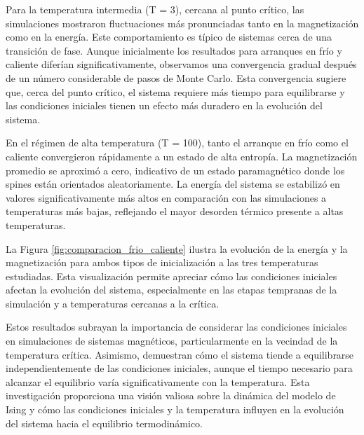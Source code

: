 \documentclass[twocolumn]{article}
\begin{document}
Para la temperatura intermedia (T = 3), cercana al punto crítico, las simulaciones mostraron fluctuaciones más pronunciadas tanto en la magnetización como en la energía. Este comportamiento es típico de sistemas cerca de una transición de fase. Aunque inicialmente los resultados para arranques en frío y caliente diferían significativamente, observamos una convergencia gradual después de un número considerable de pasos de Monte Carlo. Esta convergencia sugiere que, cerca del punto crítico, el sistema requiere más tiempo para equilibrarse y las condiciones iniciales tienen un efecto más duradero en la evolución del sistema.

En el régimen de alta temperatura (T = 100), tanto el arranque en frío como el caliente convergieron rápidamente a un estado de alta entropía. La magnetización promedio se aproximó a cero, indicativo de un estado paramagnético donde los spines están orientados aleatoriamente. La energía del sistema se estabilizó en valores significativamente más altos en comparación con las simulaciones a temperaturas más bajas, reflejando el mayor desorden térmico presente a altas temperaturas.

La Figura \ref{fig:comparacion_frio_caliente} ilustra la evolución de la energía y la magnetización para ambos tipos de inicialización a las tres temperaturas estudiadas. Esta visualización permite apreciar cómo las condiciones iniciales afectan la evolución del sistema, especialmente en las etapas tempranas de la simulación y a temperaturas cercanas a la crítica.


Estos resultados subrayan la importancia de considerar las condiciones iniciales en simulaciones de sistemas magnéticos, particularmente en la vecindad de la temperatura crítica. Asimismo, demuestran cómo el sistema tiende a equilibrarse independientemente de las condiciones iniciales, aunque el tiempo necesario para alcanzar el equilibrio varía significativamente con la temperatura. Esta investigación proporciona una visión valiosa sobre la dinámica del modelo de Ising y cómo las condiciones iniciales y la temperatura influyen en la evolución del sistema hacia el equilibrio termodinámico.
\end{document}
